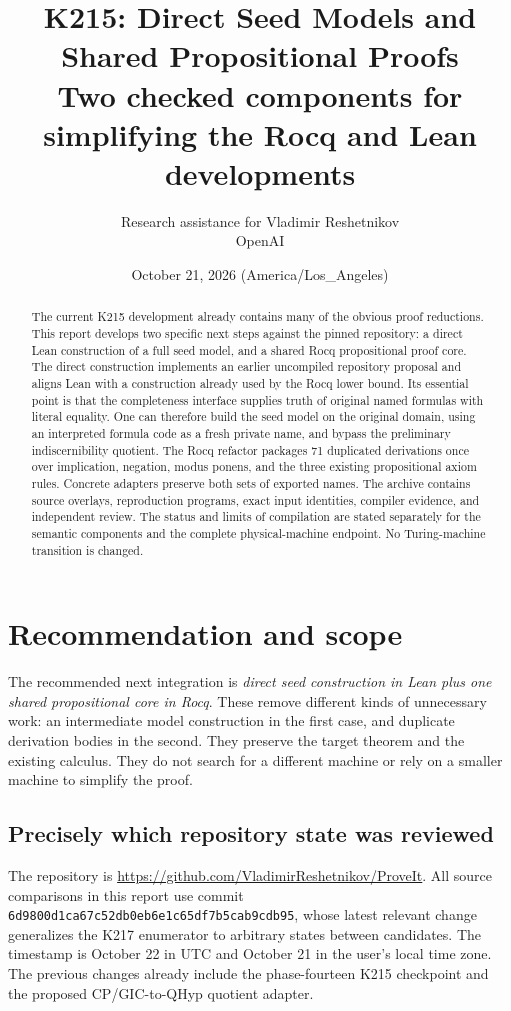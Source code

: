 \documentclass[11pt,letterpaper]{article}
\title{\textbf{K215: Direct Seed Models and\\Shared Propositional Proofs}\\[5pt]
\large Two checked components for simplifying the Rocq and Lean developments}
\author{Research assistance for Vladimir Reshetnikov\\\small OpenAI}
\date{October 21, 2026 (America/Los\_Angeles)}
\theoremstyle{definition}
\theoremstyle{remark}
\newcommand{\pin}{\texttt{6d9800d1ca67c52db0eb6e1c65df7b5cab9cdb95}}
\newcommand{\project}{\url{https://github.com/VladimirReshetnikov/ProveIt}}
\begin{document}
\maketitle
\begin{abstract}
The current K215 development already contains many of the obvious proof reductions.
This report develops two specific next steps against the pinned repository: a direct
Lean construction of a full seed model, and a shared Rocq propositional proof core.
The direct construction implements an earlier uncompiled repository proposal and
aligns Lean with a construction already used by the Rocq lower bound. Its essential
point is that the completeness interface supplies truth of original named formulas
with literal equality. One can therefore build the seed model on the original
domain, using an interpreted formula code as a fresh private name, and bypass the
preliminary indiscernibility quotient. The Rocq refactor packages 71 duplicated
derivations once over implication, negation, modus ponens, and the three existing
propositional axiom rules. Concrete adapters preserve both sets of exported names.
The archive contains source overlays, reproduction programs, exact input identities,
compiler evidence, and independent review. The status and limits of compilation are
stated separately for the semantic components and the complete physical-machine
endpoint. No Turing-machine transition is changed.
\end{abstract}

\tableofcontents
\newpage

\section{Recommendation and scope}

The recommended next integration is \emph{direct seed construction in Lean plus
one shared propositional core in Rocq}. These remove different kinds of unnecessary
work: an intermediate model construction in the first case, and duplicate derivation
bodies in the second. They preserve the target theorem and the existing calculus.
They do not search for a different machine or rely on a smaller machine to simplify
the proof.

\subsection{Precisely which repository state was reviewed}

The repository is \project. All source comparisons in this report use commit
\pin, whose latest relevant change generalizes the K217 enumerator to arbitrary
states between candidates. The timestamp is October 22 in UTC and October 21 in
the user's local time zone. The previous changes already include the phase-fourteen
K215 checkpoint and the proposed CP/GIC-to-QHyp quotient adapter.
\end{document}
